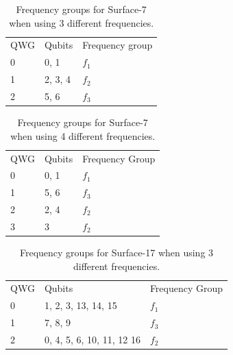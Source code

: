 \documentclass[11pt]{article}
\begin{document}
\begin{table}[h!]


\caption{\label{T1}
Frequency groups for Surface-7 when using 3 different frequencies. }
\centering

\begin{tabular}{lll}
 & \\
\hline
QWG & Qubits & Frequency group\\
\hline
\cellcolor{red!25}  0 & \cellcolor{red!25} 0, 1 & \cellcolor{red!25} $f_1$\\
\cellcolor{Aquamarine!25}  1 & \cellcolor{Aquamarine!25} 2, 3, 4 & \cellcolor{Aquamarine!25} $f_2$\\
\cellcolor{pink!25}  2 & \cellcolor{pink!25} 5, 6 & \cellcolor{pink!25} $f_3$\\

\hline
\end{tabular}
\end{table}

 
 \begin{table}[h!]


\caption{\label{T2}
Frequency groups for Surface-7 when using 4 different frequencies.}
\centering
\begin{tabular}{lll}
 & \\
\hline
QWG & Qubits & Frequency Group\\
\hline
\cellcolor{red!25}  0 & \cellcolor{red!25} 0, 1 & \cellcolor{red!25} $f_1$ \\
\cellcolor{pink!25}  1 & \cellcolor{pink!25} 5, 6 & \cellcolor{pink!25} $f_3$ \\
\cellcolor{green!25}  2 & \cellcolor{green!25} 2, 4 & \cellcolor{green!25} $f_2$ \\
\cellcolor{cyan!25}  3 & \cellcolor{cyan!25} 3 & \cellcolor{cyan!25} $f_2$ \\
\hline
\end{tabular}
\end{table}
 
 
 





\begin{table}[h!]

\caption{\label{T4}
Frequency groups for Surface-17 when using 3 different frequencies.}
\centering
\begin{tabular}{lll}
 & \\
\hline
QWG & Qubits & Frequency Group\\
\hline
\cellcolor{red!25}  0 & \cellcolor{red!25} 1, 2, 3, 13, 14, 15 & \cellcolor{red!25} $f_1$\\
\cellcolor{pink!25}  1 & \cellcolor{pink!25} 7, 8, 9 & \cellcolor{pink!25} $f_3$\\
\cellcolor{Aquamarine!25}  2 & \cellcolor{Aquamarine!25} 0, 4, 5, 6, 10, 11, 12 16 & \cellcolor{Aquamarine!25} $f_2$\\
\hline
\end{tabular}
\end{table}
\end{document}
